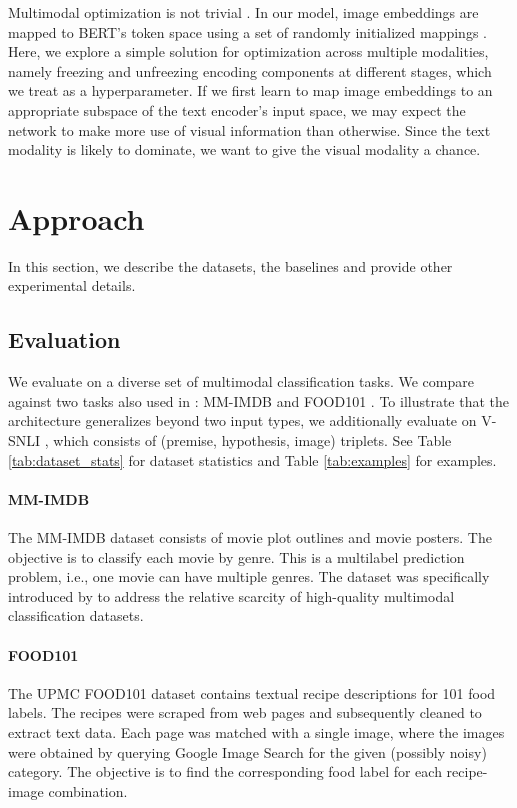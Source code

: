 \documentclass[11pt,a4paper]{article}
\begin{document}
Multimodal optimization is not trivial \cite{Wang:2019arxiv}. In our model, image embeddings are mapped to BERT's token space using a set of randomly initialized mappings . Here, we explore a simple solution for optimization across multiple modalities, namely freezing and unfreezing encoding components at different stages, which we treat as a hyperparameter. If we first learn to map image embeddings to an appropriate subspace of the text encoder's input space, we may expect the network to make more use of visual information than otherwise. Since the text modality is likely to dominate, we want to give the visual modality a chance.

\section{Approach}

In this section, we describe the datasets, the baselines and provide other experimental details.

\subsection{Evaluation}
We evaluate on a diverse set of multimodal classification tasks. We compare against two tasks also used in \cite{Kiela:2018aaai}: MM-IMDB \cite{Arevalo:2017mmimdb} and FOOD101 \cite{Wang:2015food101}. To illustrate that the architecture generalizes beyond two input types, we additionally evaluate on V-SNLI \cite{Vu:2018vsnli}, which consists of (premise, hypothesis, image) triplets. 
See Table \ref{tab:dataset_stats} for dataset statistics and Table \ref{tab:examples} for examples.

\paragraph{MM-IMDB} The MM-IMDB dataset \cite{Arevalo:2017mmimdb} consists of movie plot outlines and movie posters. The objective is to classify each movie by genre. This is a multilabel prediction problem, i.e., one movie can have multiple genres. The dataset was specifically introduced by \cite{Arevalo:2017mmimdb} to address the relative scarcity of high-quality multimodal classification datasets.

\paragraph{FOOD101} The UPMC FOOD101 dataset \cite{Wang:2015food101} contains textual recipe descriptions for 101 food labels. The recipes were scraped from web pages and subsequently cleaned to extract text data. Each page was matched with a single image, where the images were obtained by querying Google Image Search for the given (possibly noisy) category. The objective is to find the corresponding food label for each recipe-image combination.
\end{document}
